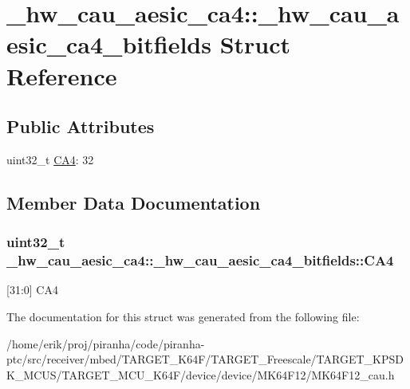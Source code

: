 \hypertarget{struct__hw__cau__aesic__ca4_1_1__hw__cau__aesic__ca4__bitfields}{}\section{\+\_\+hw\+\_\+cau\+\_\+aesic\+\_\+ca4\+:\+:\+\_\+hw\+\_\+cau\+\_\+aesic\+\_\+ca4\+\_\+bitfields Struct Reference}
\label{struct__hw__cau__aesic__ca4_1_1__hw__cau__aesic__ca4__bitfields}
\subsection*{Public Attributes}
\begin{DoxyCompactItemize}
\item 
uint32\+\_\+t \hyperlink{struct__hw__cau__aesic__ca4_1_1__hw__cau__aesic__ca4__bitfields_a53bfff240c9f494e1b4978581e847e70}{C\+A4}\+: 32
\end{DoxyCompactItemize}


\subsection{Member Data Documentation}
\subsubsection[{\texorpdfstring{C\+A4}{CA4}}]{\setlength{\rightskip}{0pt plus 5cm}uint32\+\_\+t \+\_\+hw\+\_\+cau\+\_\+aesic\+\_\+ca4\+::\+\_\+hw\+\_\+cau\+\_\+aesic\+\_\+ca4\+\_\+bitfields\+::\+C\+A4}\hypertarget{struct__hw__cau__aesic__ca4_1_1__hw__cau__aesic__ca4__bitfields_a53bfff240c9f494e1b4978581e847e70}{}\label{struct__hw__cau__aesic__ca4_1_1__hw__cau__aesic__ca4__bitfields_a53bfff240c9f494e1b4978581e847e70}
\mbox{[}31\+:0\mbox{]} C\+A4 

The documentation for this struct was generated from the following file\+:\begin{DoxyCompactItemize}
\item 
/home/erik/proj/piranha/code/piranha-\/ptc/src/receiver/mbed/\+T\+A\+R\+G\+E\+T\+\_\+\+K64\+F/\+T\+A\+R\+G\+E\+T\+\_\+\+Freescale/\+T\+A\+R\+G\+E\+T\+\_\+\+K\+P\+S\+D\+K\+\_\+\+M\+C\+U\+S/\+T\+A\+R\+G\+E\+T\+\_\+\+M\+C\+U\+\_\+\+K64\+F/device/device/\+M\+K64\+F12/M\+K64\+F12\+\_\+cau.\+h\end{DoxyCompactItemize}

